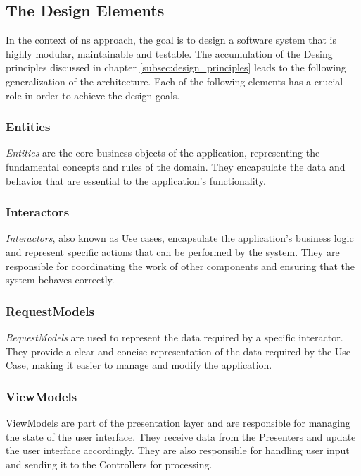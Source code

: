 \subsection{The Design Elements} \label{subsec:design_elements}

In the context of \gls{ns} approach, the goal is to design a software system that is highly
modular, maintainable and testable. The accumulation of the Desing principles discussed
in chapter \ref{subsec:design_principles} leads to the following generalization of the
architecture. Each of the following elements has a crucial role in order to achieve the
design goals.

\subsubsection*{Entities}
\textit{Entities} are the core business objects of the application, representing the fundamental
concepts and rules of the domain. They encapsulate the data and behavior that are
essential to the application's functionality.

\subsubsection*{Interactors}
\textit{Interactors}, also known as Use cases, encapsulate the application's business
logic and represent specific actions that can be performed by the system. They are
responsible for coordinating the work of other components and ensuring that the system
behaves correctly.

\subsubsection*{RequestModels}
\textit{RequestModels} are used to represent the data required by a specific interactor. They
provide a clear and concise representation of the data required by the Use Case, making it
easier to manage and modify the application.

\subsubsection*{ViewModels}
ViewModels are part of the presentation layer and are responsible for managing the state
of the user interface. They receive data from the Presenters and update the user interface
accordingly. They are also responsible for handling user input and sending it to the
Controllers for processing.

